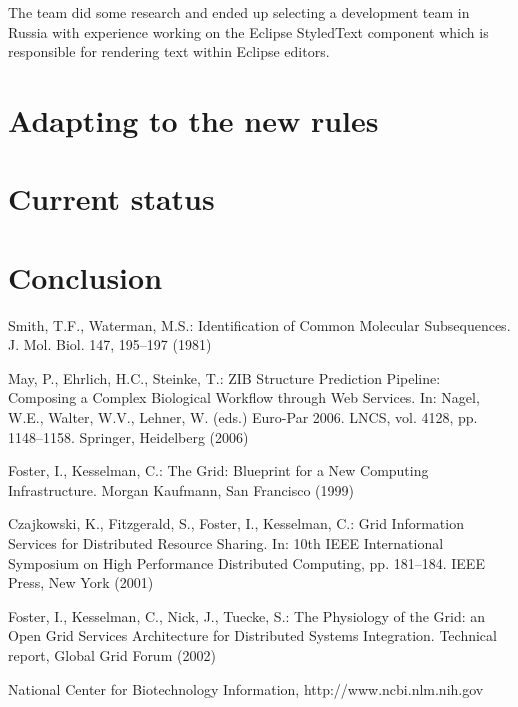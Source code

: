 \documentclass[lnbip]{svmultln}
\begin{document}
The team did some research and ended up selecting a development team
in Russia with experience working on the Eclipse StyledText component
which is responsible for rendering text within Eclipse editors.

\section{Adapting to the new rules}
\label{sec:adapting}

\section{Current status}
\label{sec:nowadays}

\section{Conclusion}
\label{sec:conclusion}

%
%
\begin{thebibliography}{5}

 Smith, T.F., Waterman, M.S.: Identification of Common Molecular
Subsequences. J. Mol. Biol. 147, 195--197 (1981)

 May, P., Ehrlich, H.C., Steinke, T.: ZIB Structure Prediction Pipeline:
Composing a Complex Biological Workflow through Web Services. In: Nagel,
W.E., Walter, W.V., Lehner, W. (eds.) Euro-Par 2006. LNCS, vol. 4128,
pp. 1148--1158. Springer, Heidelberg (2006)

 Foster, I., Kesselman, C.: The Grid: Blueprint for a New Computing
Infrastructure. Morgan Kaufmann, San Francisco (1999)

 Czajkowski, K., Fitzgerald, S., Foster, I., Kesselman, C.: Grid
Information Services for Distributed Resource Sharing. In: 10th IEEE
International Symposium on High Performance Distributed Computing, pp.
181--184. IEEE Press, New York (2001)

 Foster, I., Kesselman, C., Nick, J., Tuecke, S.: The Physiology of the
Grid: an Open Grid Services Architecture for Distributed Systems
Integration. Technical report, Global Grid Forum (2002)

 National Center for Biotechnology Information, http://www.ncbi.nlm.nih.gov

\end{thebibliography}
%
\end{document}

